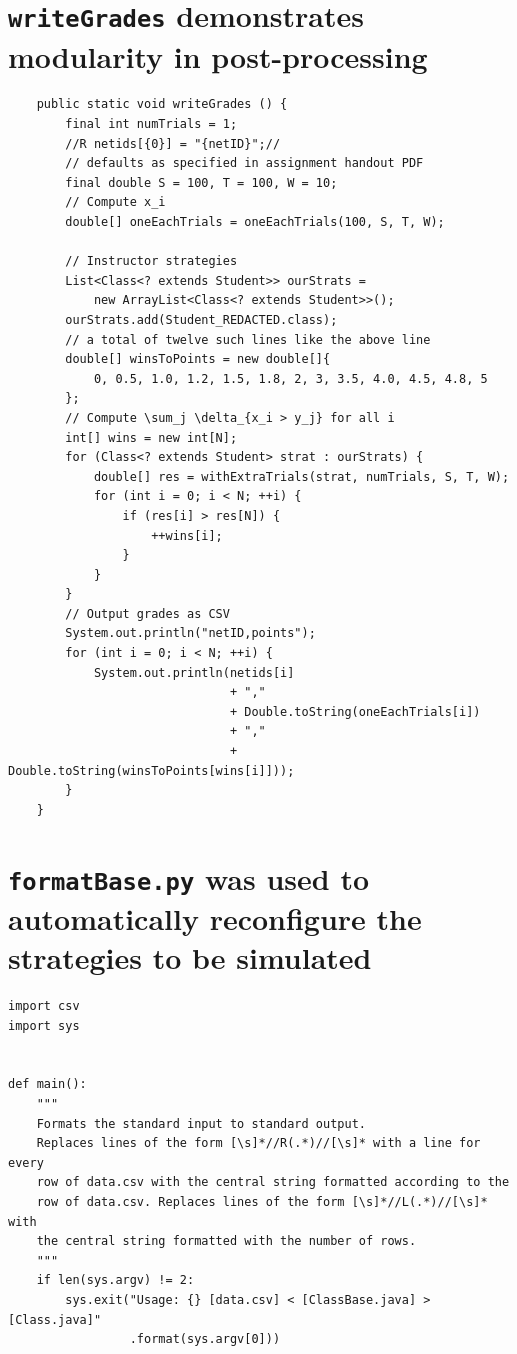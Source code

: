 \documentclass[pageno]{jpaper}
\begin{document}
\newpage
\begin{appendices}
  \singlespacing{}
  \appendixpage{}
  \section{\texttt{writeGrades} demonstrates modularity in post-processing}\label{appendix:writeGrades}
\begin{verbatim}
    public static void writeGrades () {
        final int numTrials = 1;
        //R netids[{0}] = "{netID}";//
        // defaults as specified in assignment handout PDF
        final double S = 100, T = 100, W = 10;
        // Compute x_i
        double[] oneEachTrials = oneEachTrials(100, S, T, W);

        // Instructor strategies
        List<Class<? extends Student>> ourStrats =
            new ArrayList<Class<? extends Student>>();
        ourStrats.add(Student_REDACTED.class);
        // a total of twelve such lines like the above line
        double[] winsToPoints = new double[]{
            0, 0.5, 1.0, 1.2, 1.5, 1.8, 2, 3, 3.5, 4.0, 4.5, 4.8, 5
        };
        // Compute \sum_j \delta_{x_i > y_j} for all i
        int[] wins = new int[N];
        for (Class<? extends Student> strat : ourStrats) {
            double[] res = withExtraTrials(strat, numTrials, S, T, W);
            for (int i = 0; i < N; ++i) {
                if (res[i] > res[N]) {
                    ++wins[i];
                }
            }
        }
        // Output grades as CSV
        System.out.println("netID,points");
        for (int i = 0; i < N; ++i) {
            System.out.println(netids[i]
                               + ","
                               + Double.toString(oneEachTrials[i])
                               + ","
                               + Double.toString(winsToPoints[wins[i]]));
        }
    }
\end{verbatim}
  \newpage
  \section{\texttt{formatBase.py} was used to automatically reconfigure the strategies to be simulated}\label{appendix:formatBase}
\begin{verbatim}
import csv
import sys


def main():
    """
    Formats the standard input to standard output.
    Replaces lines of the form [\s]*//R(.*)//[\s]* with a line for every
    row of data.csv with the central string formatted according to the
    row of data.csv. Replaces lines of the form [\s]*//L(.*)//[\s]* with
    the central string formatted with the number of rows.
    """
    if len(sys.argv) != 2:
        sys.exit("Usage: {} [data.csv] < [ClassBase.java] > [Class.java]"
                 .format(sys.argv[0]))


\end{verbatim}
\end{appendices}
\end{document}
